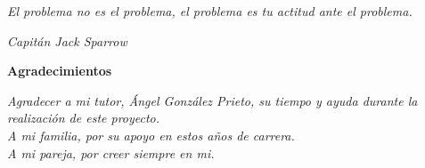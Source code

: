 
\thispagestyle{empty}

\begin{minipage}[c][\textheight][c]{\textwidth}
    \raggedleft
    
    \textit{El problema no es el problema, el problema es tu actitud ante el problema.\\
    }
    
    \bigskip
    \emph{Capitán Jack Sparrow}
\end{minipage}


\newpage
\thispagestyle{empty}

\begin{center}
    {\fontsize{20}{80}\selectfont \textbf{Agradecimientos}\\}
\end{center}
\bigskip

\begin{raggedleft}
    \vspace*{\fill}
    \textit{Agradecer a mi tutor, Ángel González Prieto, su tiempo y ayuda durante la realización de este proyecto.\\}
    \bigskip
    \textit{A mi familia, por su apoyo en estos años de carrera.\\}
    \bigskip
    \textit{A mi pareja, por creer siempre en mi.\\}
    \vspace*{\fill}
\end{raggedleft}

\newpage